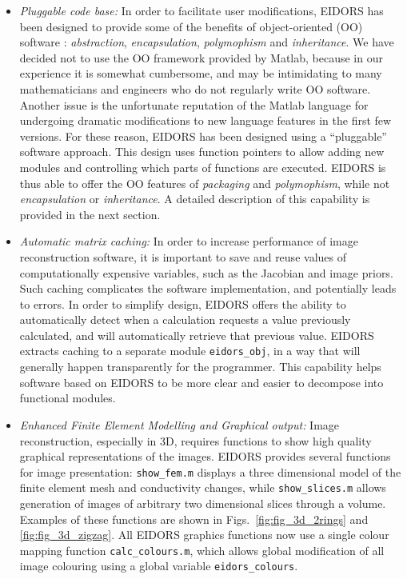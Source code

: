 \documentclass[12pt]{iopart}
\begin{document}
\begin{itemize}
  \item {\em Pluggable code base:}
In order to facilitate user modifications, EIDORS
has been designed to provide some of the benefits of
object-oriented (OO) software \cite{Gamma_etal_1995}:
{\em abstraction}, {\em encapsulation}, 
{\em polymophism} and {\em inheritance}.
We have decided not to
use the OO framework provided by Matlab, because
in our experience it is somewhat cumbersome,
and may be intimidating
to many mathematicians and engineers who do not 
regularly write OO software.
Another issue is the unfortunate reputation of
the Matlab language for undergoing dramatic modifications to new
language features in the first few versions.
For these reason, EIDORS has been designed using
a  ``pluggable'' software approach.
This design uses function
pointers to allow adding new modules and controlling
which parts of functions are executed.
EIDORS is thus able to offer the OO features 
of {\em packaging} and {\em polymophism}, while
not {\em encapsulation} or {\em inheritance}.
A detailed description of this capability is
provided in the next section.

  \item {\em Automatic matrix caching:}
In order to increase
performance of image reconstruction software, it is important to save
and reuse values of 
computationally expensive variables, such as the Jacobian and image priors.
Such caching complicates the software implementation, and
potentially leads to errors. In order to simplify design, EIDORS
offers the ability to automatically detect when a calculation
requests a value previously calculated, and will automatically
retrieve that previous value.
EIDORS extracts caching to a separate module {\tt eidors\_obj},
in a way that will generally happen transparently for the
programmer. This capability helps software based on EIDORS
to be more clear and easier to decompose into functional
modules.


  \item {\em Enhanced Finite Element Modelling and Graphical output:}
Image reconstruction, especially in 3D, requires functions
to show high quality graphical representations of the images.
EIDORS provides several functions for image presentation:
{\tt show\_fem.m} displays a three dimensional model of the
finite element mesh and conductivity changes, while
{\tt show\_slices.m} allows generation of images of arbitrary
two dimensional slices through a volume. Examples of these
functions are shown in Figs.~\ref{fig:fig_3d_2rings} and
 \ref{fig:fig_3d_zigzag}.
All EIDORS graphics functions now use a single colour
mapping function {\tt calc\_colours.m}, which allows
global modification of all image colouring using a
global variable {\tt eidors\_colours}.



\end{itemize}
\end{document}
